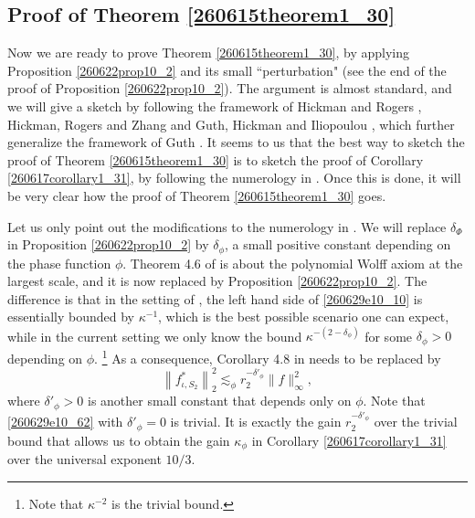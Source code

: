 \documentclass{article}
\numberwithin{equation}{section}
\theoremstyle{plain}
\begin{document}
\subsection{Proof of Theorem \ref{260615theorem1_30}}



Now we are ready to prove 
Theorem \ref{260615theorem1_30}, by applying Proposition \ref{260622prop10_2} and its small ``perturbation" (see the end of the proof of Proposition \ref{260622prop10_2}). The argument is almost standard, and we will give a sketch by following the framework of Hickman and Rogers \cite{hickman2019improved}, Hickman, Rogers and Zhang \cite{HRZ22} and Guth, Hickman and Iliopoulou \cite{GHI19}, which further generalize the framework of Guth \cite{guth2016restriction}. 
It seems to us that the best way to sketch the proof of Theorem \ref{260615theorem1_30} is to sketch the proof of Corollary \ref{260617corollary1_31}, by following  the numerology in \cite{DGGZ24}. Once this is done, it will be very clear how the proof of Theorem \ref{260615theorem1_30} goes.  



Let us only point out the modifications to the numerology in \cite{DGGZ24}.
We will replace $\delta_{\Phi}$ in Proposition \ref{260622prop10_2} by $\delta_{\phi}$, a small positive constant depending on the phase function $\phi$.  
Theorem 4.6 of \cite{DGGZ24} is about the polynomial Wolff axiom at the largest scale, and it is now replaced by Proposition \ref{260622prop10_2}. The difference is that in the setting of \cite[Theorem 4.6]{DGGZ24}, the left hand side of \eqref{260629e10_10} is essentially bounded by $\kappa^{-1}$, which is the best possible scenario one can expect,  while in the current setting we only know the bound $\kappa^{-(2-\delta_{\phi})}$ for some $\delta_{\phi}>0$ depending on $\phi$. \footnote{Note that $\kappa^{-2}$ is the trivial bound.} As a consequence, Corollary 4.8 in \cite{DGGZ24} needs to be replaced by
\begin{equation}\label{260629e10_62}
    \left\|f_{\iota, S_2}^*\right\|_2^2 \lesssim_{\phi} r_2^{-\delta'_{\phi}}\|f\|_{\infty}^2,
\end{equation}
where $\delta'_{\phi}>0$ is another small constant that depends only on $\phi$. Note that \eqref{260629e10_62} with $\delta'_{\phi}=0$ is trivial. 
 It is exactly the gain $r_2^{-\delta'_{\phi}}$ over the trivial bound  that allows us to obtain the gain $\kappa_{\phi}$  in Corollary \ref{260617corollary1_31} over the universal exponent $10/3$. 
\end{document}
